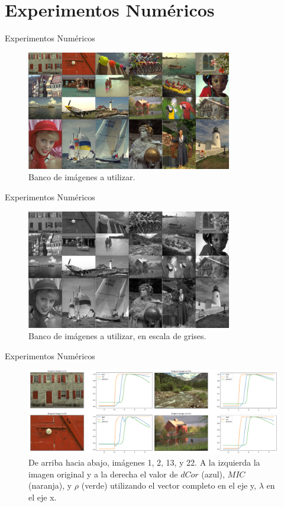 \documentclass{beamer}
\begin{document}
\section{Experimentos Numéricos}
\begin{frame}{Experimentos Numéricos}
    \begin{figure}[H]
        \centering
        \includegraphics[width=0.8\textwidth]{all_images_grid.png}
        \caption{Banco de im\'agenes a utilizar.}
    \end{figure}        
\end{frame}

\begin{frame}{Experimentos Numéricos}
    \begin{figure}[H]
        \centering
        \includegraphics[width=0.8\textwidth]{all_images_grid_bw.png}
        \caption{Banco de im\'agenes a utilizar, en escala de grises.}
    \end{figure}     
\end{frame}

\begin{frame}{Experimentos Numéricos}
    \begin{figure}[H]
        \centering
        \includegraphics[width=\textwidth]{lam_v_com_all_img.png}
        \caption{De arriba hacia abajo, im\'agenes 1, 2, 13, y 22. A la izquierda la imagen original y a la derecha el valor de $dCor$ (azul), $MIC$ (naranja), y $\rho$ (verde) utilizando el vector completo en el eje y, $\lambda$ en el eje x.}
    \end{figure}
\end{frame}
\end{document}

